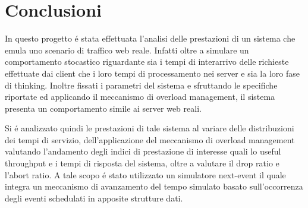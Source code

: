 \section{Conclusioni}

In questo progetto \'e stata effettuata l'analisi delle prestazioni di un 
sistema che emula uno scenario di traffico web reale.
Infatti oltre a simulare un comportamento stocastico riguardante sia i tempi di interarrivo delle 
richieste effettuate dai client che i loro tempi di processamento nei server e sia la loro fase di thinking. Inoltre fissati i parametri del sistema e sfruttando le specifiche riportate ed applicando il meccanismo di 
overload management, il sistema presenta un comportamento simile ai server web reali. 

Si \'e analizzato quindi le prestazioni di tale sistema al variare delle distribuzioni dei tempi di 
servizio, dell'applicazione del meccanismo di overload management valutando l'andamento 
degli indici di prestazione di interesse quali lo useful throughput e i tempi di risposta del 
sistema, oltre a valutare il drop ratio e l'abort ratio. A tale scopo \'e stato utilizzato un 
simulatore next-event il quale integra un meccanismo di avanzamento del tempo simulato 
basato sull'occorrenza degli eventi schedulati in apposite strutture dati.